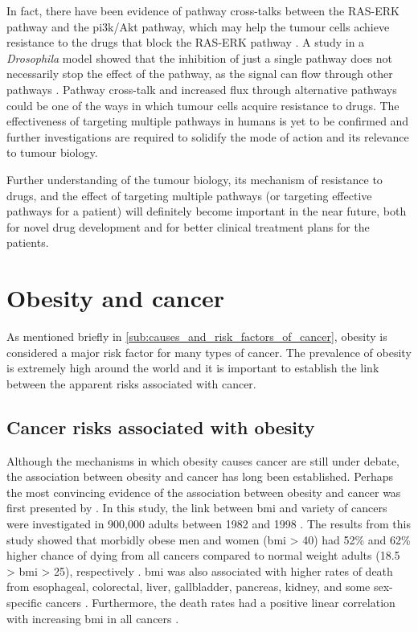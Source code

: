 In fact, there have been evidence of pathway cross-talks between the RAS-ERK pathway and the \gls{pi3k}/Akt pathway, which may help the tumour cells achieve resistance to the  drugs that block the RAS-ERK pathway \citep{Moelling2002,Zimmermann1999a}.
A study in a \textit{Drosophila} model showed that the inhibition of just a single pathway does not necessarily stop the effect of the pathway, as the signal can flow through other pathways \citep{Dar2012}.
Pathway cross-talk and increased flux through alternative pathways could be one of the ways in which tumour cells acquire resistance to drugs.
The effectiveness of targeting multiple pathways in humans is yet to be confirmed and further investigations are required to solidify the mode of action and its relevance to tumour biology.

Further understanding of the tumour biology, its mechanism of resistance to drugs, and the effect of targeting multiple pathways (or targeting effective pathways for a patient) will definitely become important in the near future, both for novel drug development and for better clinical treatment plans for the patients.

\section{Obesity and cancer}
\label{sec:obesity_and_cancer}

As mentioned briefly in \cref{sub:causes_and_risk_factors_of_cancer}, obesity is considered a major risk factor for many types of cancer.
The prevalence of obesity is extremely high around the world and  it is important to establish the link between the apparent risks associated with cancer.

\subsection{Cancer risks associated with obesity}
\label{sub:cancer_risks_associated_with_obesity}

Although the mechanisms in which obesity causes cancer are still under debate, the association between obesity and cancer has long been established.
Perhaps the most convincing evidence of the association between obesity and cancer was first presented by \citet{Calle2003}.
In this study, the link between \gls{bmi} and variety of cancers were investigated in 900,000 adults between 1982 and 1998 \citep{Calle2003}.
The results from this study showed that morbidly obese men and women (\gls{bmi} \textgreater{} 40) had 52\% and 62\% higher chance of dying from all cancers compared to normal weight adults (18.5 \textgreater{} \gls{bmi} \textgreater{} 25), respectively \citep{Calle2003}.
\gls{bmi} was also associated with higher rates of death from esophageal, colorectal, liver, gallbladder, pancreas, kidney, and some sex-specific cancers \citep{Calle2003}.
Furthermore, the death rates had a positive linear correlation with increasing \gls{bmi} in all cancers \citep{Calle2003}.

